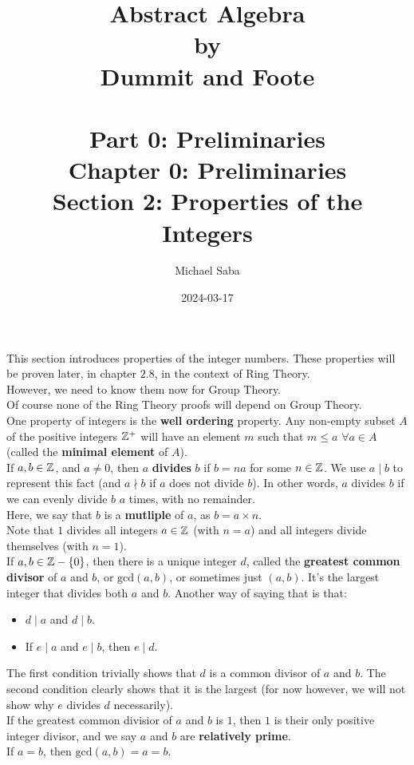 \documentclass[12pt]{article}
\title{%
    \Huge Abstract Algebra \\
    \large by \\
    \Large Dummit and Foote \\~\\
    \huge Part 0: Preliminaries \\
    \LARGE Chapter 0: Preliminaries \\
    \Large Section 2: Properties of the Integers
}
\date{2024-03-17}
\author{Michael Saba}
\begin{document}
    \maketitle
    \newpage    
    \setlength{\parindent}{0pt}

    This section introduces properties of the integer numbers.
    These properties will be proven later, in chapter $2.8$,
    in the context of Ring Theory. \\
    However, we need to know them now for Group Theory. \\
    Of course none of the Ring Theory proofs will depend
    on Group Theory. \\

    One property of integers is the \textbf{well ordering} property.
    Any non-empty subset $A$ of the positive integers $\mathbb{Z}^+$
    will have an element $m$
    such that $m \leqslant a$ $\forall a \in A$
    (called the \textbf{minimal element} of $A$). \\

    If $a, b \in \mathbb{Z}$, and $a \neq 0$,
    then $a$ \textbf{divides} $b$ if $b = na$ for some $n \in \mathbb{Z}$.
    We use $a \mid b$ to represent this fact
    (and $a \nmid b$ if $a$ does not divide $b$).
    In other words, $a$ divides $b$ if we can evenly divide
    $b$ $a$ times, with no remainder. \\
    Here, we say that $b$ is a \textbf{mutliple} of $a$,
    as $b = a \times n$. \\
    Note that $1$ divides all integers $a \in \mathbb{Z}$ (with $n = a$)
    and all integers divide themselves (with $n = 1$). \\
    

    If $a, b \in \mathbb{Z} - \{0\}$,
    then there is a unique integer $d$,
    called the \textbf{greatest common divisor} of $a$ and $b$,
    or $\text{gcd}(a, b)$, or sometimes just $(a, b)$.
    It's the largest integer that divides both $a$ and $b$.
    Another way of saying that is that:
    \begin{itemize}[label=$\diamond$]
        \item 
            $d \mid a$ and $d \mid b$.
        \item
            If $e \mid a$ and $e \mid b$, then $e \mid d$.
    \end{itemize}
    The first condition trivially shows that $d$ is a common divisor
    of $a$ and $b$.
    The second condition clearly shows that it is the largest
    (for now however, we will not show why $e$ divides $d$
    necessarily). \\
    If the greatest common divisior of $a$ and $b$ is $1$,
    then $1$ is their only positive integer divisor, 
    and we say $a$ and $b$ are \textbf{relatively prime}. \\
    If $a = b$, then $\text{gcd}(a, b) = a = b$. \\
 
\end{document}
